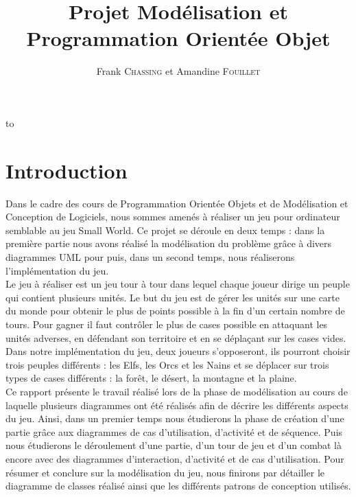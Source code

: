 \documentclass[a4paper,11pt]{article}
\author{}
\title{}
\title{\LARGE{Projet Modélisation et Programmation Orientée Objet}}
\author{Frank \textsc{Chassing} et Amandine \textsc{Fouillet}}
\makeatletter
\def\clap#1{\hbox to 0pt{\hss #1\hss}}%
\def\haut#1#2#3{%
\hbox to \hsize{%
\rlap{\vtop{\raggedright #1}}%
\hss
\clap{\vtop{\centering #2}}%
\hss
\llap{\vtop{\raggedleft #3}}}}%
\def\bas#1#2#3{%
\hbox to \hsize{%
\rlap{\vbox{\raggedright #1}}%
\hss
\clap{\vbox{\centering #2}}%
\hss
\llap{\vbox{\raggedleft #3}}}}%
\def\maketitle{%
\thispagestyle{empty}\vbox to \vsize{%
\haut{}{\@blurb}{}
\vfill
\vspace{1cm}
\begin{flushleft}
\usefont{OT1}{ptm}{m}{n}
\huge \@title
\end{flushleft}
\par
\hrule height 4pt
\par
\begin{flushright}
\usefont{OT1}{phv}{m}{n}
\Large \@author
\par
\end{flushright}
\vspace{1cm}
\vfill
\vfill
\bas{}{\@location, le \@date}{}
}%
\cleardoublepage
}
\makeatother
\begin{document}
\maketitle
\tableofcontents
\newpage
\section*{Introduction}
Dans le cadre des cours de Programmation Orientée Objets et de Modélisation et Conception de Logiciels, nous sommes amenés à réaliser un jeu pour ordinateur semblable au jeu Small World. Ce projet se déroule en deux temps : dans la première partie nous avons réalisé la modélisation du problème grâce à divers diagrammes UML pour puis, dans un second temps, nous réaliserons l'implémentation du jeu. \\

Le jeu à réaliser est un jeu tour à tour dans lequel chaque joueur dirige un peuple qui contient plusieurs unités. Le but du jeu est de gérer les unités sur une carte du monde pour obtenir le plus de points possible à la fin d'un certain nombre de tours. Pour gagner il faut contrôler le plus de cases possible en attaquant les unités adverses, en défendant son territoire et en se déplaçant sur les cases vides. Dans notre implémentation du jeu, deux joueurs s'opposeront, ils pourront choisir trois peuples différents : les Elfs, les Orcs et les Nains et se déplacer sur trois types de cases différents : la forêt, le désert, la montagne et la plaine.\\

Ce rapport présente le travail réalisé lors de la phase de modélisation au cours de laquelle plusieurs diagrammes ont été réalisés afin de décrire les différents aspects du jeu. Ainsi, dans un premier temps nous étudierons la phase de création d'une partie grâce aux diagrammes de cas d'utilisation, d'activité et de séquence. Puis nous étudierons le déroulement d'une partie, d'un tour de jeu et d'un combat là encore avec des diagrammes d'interaction, d'activité et de cas d'utilisation. Pour résumer et conclure sur la modélisation du jeu, nous finirons par détailler le diagramme de classes réalisé ainsi que les différents patrons de conception utilisés.
\newpage
\end{document}
